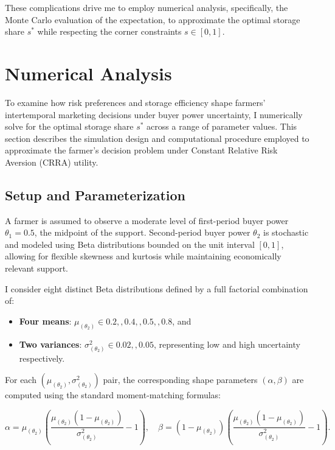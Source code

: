 These complications drive me to employ numerical analysis, specifically, the Monte Carlo evaluation of the expectation, to approximate the optimal storage share $s^{*}$ while respecting the corner constraints $s\in[0,1]$.





\section{Numerical Analysis} \label{Section: Base Model Numerical Analysis}
\noindent To examine how risk preferences and storage efficiency shape farmers' intertemporal marketing decisions under buyer power uncertainty, I numerically solve for the optimal storage share $s^*$ across a range of parameter values. This section describes the simulation design and computational procedure employed to approximate the farmer's decision problem under Constant Relative Risk Aversion (CRRA) utility.


\subsection{Setup and Parameterization}
\noindent A farmer is assumed to observe a moderate level of first-period buyer power $\theta_1 = 0.5$, the midpoint of the support. Second-period buyer power $\theta_2$ is stochastic and modeled using Beta distributions bounded on the unit interval $[0,1]$, allowing for flexible skewness and kurtosis while maintaining economically relevant support.

I consider eight distinct Beta distributions defined by a full factorial combination of:
\begin{itemize}
\item \textbf{Four means}: $\mu_{(\theta_2)} \in {0.2,,0.4,,0.5,,0.8}$, and
\item \textbf{Two variances}: $\sigma^2_{(\theta_2)} \in {0.02,,0.05}$, representing low and high uncertainty respectively.
\end{itemize}

For each $(\mu_{(\theta_2)}, \sigma^2_{(\theta_2)})$ pair, the corresponding shape parameters $(\alpha, \beta)$ are computed using the standard moment-matching formulas:

$$
\alpha = \mu_{(\theta_2)} \left( \frac{\mu_{(\theta_2)}(1 - \mu_{(\theta_2)})}{\sigma^2_{(\theta_2)}} - 1 \right), \quad
\beta = (1 - \mu_{(\theta_2)}) \left( \frac{\mu_{(\theta_2)}(1 - \mu_{(\theta_2)})}{\sigma^2_{(\theta_2)}} - 1 \right).
$$

